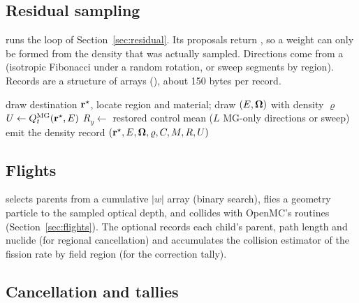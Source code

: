 \subsection{Residual sampling}

 runs the loop of Section~\ref{sec:residual}.
Its proposals return , so a weight can only be formed from the density
that was actually sampled. Directions come from a  (isotropic Fibonacci under a
random rotation, or sweep segments by region). Records are a structure of arrays (), about 150
bytes per record.

\begin{algorithm}[h]
\caption{One residual sample (density route; tag $t$)}\label{alg:sample}
\DontPrintSemicolon
draw destination $\mathbf r^\star$, locate region and material; draw $(E,\boldsymbol\Omega)$ with density $\varrho$\;
$U\gets Q^{\mathrm{MG}}_t(\mathbf r^\star,E)$\;
$R_y\gets$ restored control mean ($L$ MG-only directions or sweep)\;
emit the density record $(\mathbf r^\star,E,\boldsymbol\Omega,\varrho,C,M,R,U)$\;
\end{algorithm}

\subsection{Flights}

 selects parents from a
cumulative $|w|$ array (binary search), flies a geometry particle to the sampled optical depth, and
collides with OpenMC's routines (Section~\ref{sec:flights}). The optional  records each
child's parent, path length and nuclide (for regional cancellation) and accumulates the collision
estimator of the fission rate by field region (for the correction tally).

\subsection{Cancellation and tallies}

